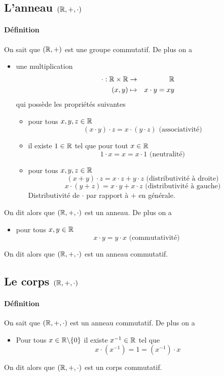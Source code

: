 %
\subsection{L'anneau $(\mathbb{R}, +, \cdot)$ }
%
\paragraph{Définition} On sait que $(\mathbb{R}, +)$ est une groupe commutatif. De plus on a
\begin{itemize}
  \item une multiplication
    \begin{eqnarray*}
      \cdot: \mathbb{R} \times \mathbb{R} &\rightarrow& \mathbb{R} \\
      (x, y) &\mapsto& x \cdot y = x y
    \end{eqnarray*}
    qui possède les propriétés suivantes
    \begin{itemize}
      \item pour tous $x, y, z \in \mathbb{R}$
        $$(x \cdot y) \cdot z = x \cdot (y \cdot z) \text{ (associativité) }$$
      \item il existe $1 \in \mathbb{R}$ tel que pour tout $x \in \mathbb{R}$
        $$1 \cdot x = x = x \cdot 1 \text{ (neutralité) }$$
      \item pour tous $x, y, z \in \mathbb{R}$
        $$(x + y) \cdot z = x \cdot z + y \cdot z \text{ (distributivité à droite) }$$
        $$x \cdot (y + z) = x \cdot y + x \cdot z \text{ (distributivité à gauche) }$$
        Distributivité de $\cdot$ par rapport à $+$ en générale.
    \end{itemize}
\end{itemize}
On dit alors que $(\mathbb{R}, +, \cdot)$ est un anneau. De plus on a
\begin{itemize}
  \item pour tous $x, y \in \mathbb{R}$
    $$x \cdot y = y \cdot x \text{ (commutativité) }$$
\end{itemize}
On dit alors que $(\mathbb{R}, + , \cdot)$ est un anneau commutatif.

%
\subsection{Le corps $(\mathbb{R}, +, \cdot)$}
%
\paragraph{Définition} On sait que $(\mathbb{R}, + , \cdot)$ est un anneau commutatif. De plus on a
\begin{itemize}
  \item Pour tous $x \in \mathbb{R} \backslash \{0\}$ il existe $x^{-1} \in \mathbb{R}$ tel que 
    $$x \cdot (x^{-1}) = 1 = (x^{-1}) \cdot x$$
\end{itemize}
On dit alors que $(\mathbb{R}, +, \cdot)$ est un corps commutatif.

